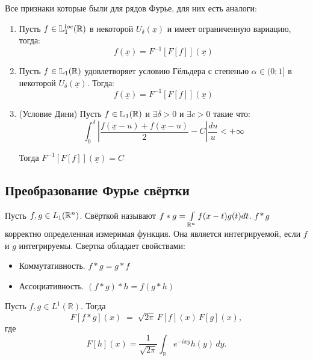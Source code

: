 \begin{corollary}
    Все признаки которые были для рядов Фурье, для них есть аналоги:
    \begin{enumerate}
        \item Пусть $f \in \mathbb{L}^{loc}_1(\mathbb{R})$ в некоторой $U_\delta(\underline{x})$ и имеет ограниченную вариацию, тогда:
        \[
            f(\underline{x}) = F^{-1} [F[f]] (\underline{x})
        \]
        \item Пусть $f \in \mathbb{L}_1(\mathbb{R})$ удовлетворяет условию Гёльдера с степенью $\alpha \in (0; 1]$ в некоторой $U_\delta(\underline{x})$. Тогда:
        \[
            f(\underline{x}) = F^{-1} [F[f]] (\underline{x})
        \]
        \item (Условие Дини) Пусть $f \in  \mathbb{L}_1(\mathbb{R})$ и $\exists \delta > 0$ и $\exists c > 0$ такие что:
        \[
            \int_0^\delta | \frac{f(\underline{x} - u)+f(\underline{x} - u)}{2} - C |  \frac{du}{u} < +\infty \]

        Тогда $F^{-1} [F[f]] (\underline{x}) = C$

    \end{enumerate}
\end{corollary}
\subsection{Преобразование Фурье свёртки}
\begin{reminder}
    Пусть $f, g \in L_1(\mathbb{R}^n)$. Свёрткой называют $f * g = \int\limits_{\mathbb{R}^n} f(x-t)g(t)dt$. $f*g$ корректно определенная измеримая функция. Она является интегрируемой, если $f$ и $g$ интегрируемы. Свертка обладает свойствами:
    \begin{itemize}
        \item Коммутативность. $f*g = g*f$
        \item Ассоциативность. $(f*g)*h = f(g*h)$
    \end{itemize}
\end{reminder}

\begin{theorem}
    Пусть $f,g\in L^1(\mathbb R)$. Тогда
    \[
        F[f * g](x) \;=\;\sqrt{2\pi}\, F[f](x)\,   F[g](x),
    \]
    где
    \[
        F[h](x)=\frac1{\sqrt{2\pi}}\int_{\mathbb R}e^{-i x y}h(y)\,dy.
    \]
\end{theorem}

